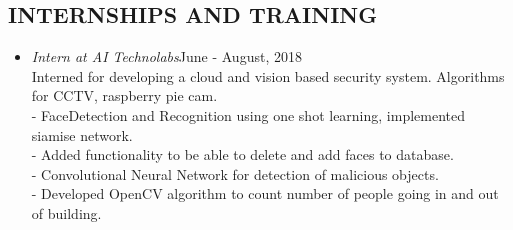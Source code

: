 \documentclass[margin]{res}
\begin{document}
\begin{resume}
\section{INTERNSHIPS AND TRAINING} \begin{itemize}
 \item{\large{\sl Intern at AI Technolabs}}\hfill June - August, 2018 \\
 	Interned for developing a cloud and vision based security system. Algorithms for CCTV, raspberry pie cam.\\
	- FaceDetection and Recognition using one shot learning, implemented siamise network.\\
	- Added functionality to be able to delete and add faces to database.\\
	- Convolutional Neural Network for detection of malicious objects.\\
	- Developed OpenCV algorithm to count number of people going in and out of building.\\
 \end{itemize}

\end{resume}
\end{document}
